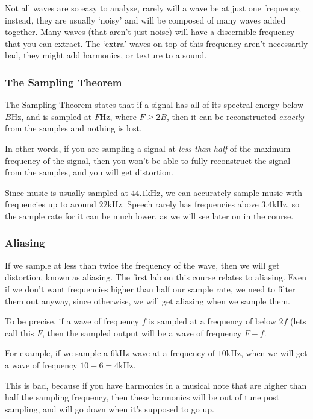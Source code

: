 Not all waves are so easy to analyse, rarely will a wave be at just one
frequency, instead, they are usually `noisy' and will be composed of many waves
added together. Many waves (that aren't just noise) will have a discernible
frequency that you can extract. The `extra' waves on top of this frequency
aren't necessarily bad, they might add harmonics, or texture to a sound.

\subsubsection{The Sampling Theorem}


The Sampling Theorem states that if a signal has all of its spectral energy
below $B$Hz, and is sampled at $F$Hz, where $F \geq 2B$, then it can be
reconstructed \textit{exactly} from the samples and nothing is lost.

In other words, if you are sampling a signal at \textit{less than half} of the
maximum frequency of the signal, then you won't be able to fully reconstruct the
signal from the samples, and you will get distortion.

Since music is usually sampled at $44.1$\si{\kilo\hertz}, we can accurately
sample music with frequencies up to around $22$\si{\kilo\hertz}. Speech rarely
has frequencies above $3.4$\si{\kilo\hertz}, so the sample rate for it can be
much lower, as we will see later on in the course.

\subsubsection{Aliasing}

If we sample at less than twice the frequency of the wave, then we will get
distortion, known as aliasing. The first lab on this course relates to aliasing.
Even if we don't want frequencies higher than half our sample rate, we need to
filter them out anyway, since otherwise, we will get aliasing when we sample
them.

To be precise, if a wave of frequency $f$ is sampled at a frequency of below
$2f$ (lets call this $F$, then the sampled output will be a wave of frequency $F
- f$.

For example, if we sample a $6\si{\kilo\hertz}$ wave at a frequency of
$10\si{\kilo\hertz}$, when we will get a wave of frequency $10-6 =
4\si{\kilo\hertz}$.

This is bad, because if you have harmonics in a musical note that are higher
than half the sampling frequency, then these harmonics will be out of tune post
sampling, and will go down when it's supposed to go up.

